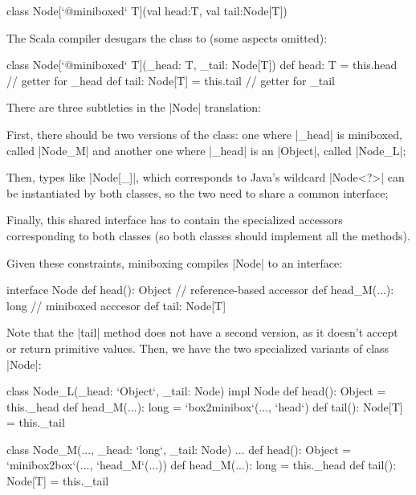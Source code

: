 \begin{lstlisting-nobreak}
 class Node[`@miniboxed` T](val head:T, val tail:Node[T])
\end{lstlisting-nobreak}

The Scala compiler desugars the class to (some aspects omitted):

\begin{lstlisting-nobreak}
 class Node[`@miniboxed` T](_head: T, _tail: Node[T]) {
   def head: T = this.head                 // getter for _head
   def tail: Node[T] = this.tail // getter for _tail
 }
\end{lstlisting-nobreak}

There are three subtleties in the |Node| translation:
\begin{compactitem}
  \item First, there should be two versions of the class: one where |_head| is miniboxed, called |Node_M| and another one where |_head| is an |Object|, called |Node_L|;
  \item Then, types like |Node[_]|, which corresponds to Java's wildcard |Node<?>| can be instantiated by both classes, so the two need to share a common interface;
  \item Finally, this shared interface has to contain the specialized accessors corresponding to both classes (so both classes should implement all the methods).
\end{compactitem}

Given these constraints, miniboxing compiles |Node| to an interface:

\begin{lstlisting-nobreak}
 interface Node {
   def head(): Object           // reference-based accessor
   def head_M(...): long // miniboxed acccesor
   def tail: Node[T]
 }
\end{lstlisting-nobreak}

Note that the |tail| method does not have a second version, as it doesn't accept or return primitive values. Then, we have the two specialized variants of class |Node|:

\begin{lstlisting-nobreak}
 class Node_L(_head: `Object`, _tail: Node) impl Node {
   def head(): Object = this._head
   def head_M(...): long = `box2minibox`(..., `head`)
   def tail(): Node[T] = this._tail
 }

 class Node_M(..., _head: `long`, _tail: Node) ... {
   def head(): Object = `minibox2box`(..., `head_M`(...))
   def head_M(...): long = this._head
   def tail(): Node[T] = this._tail
 }
\end{lstlisting-nobreak}


